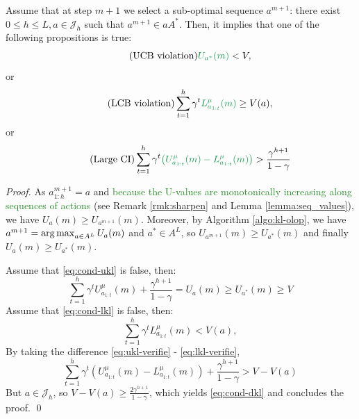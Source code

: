 \documentclass[runningheads]{llncs}
\newcommand{\diff}[1]{\textcolor{ForestGreen}{#1}}
\begin{document}
\begin{lemma}
\label{lemma:sub-optimal-pull}
Assume that at step $m+1$ we select a sub-optimal sequence $a^{m+1}$: there exist $0 \leq h \leq L,  a\in \mathcal{J}_h$ such that $a^{m+1} \in aA^*$. Then, it implies that one of the following propositions is true:
\begin{equation}
\label{eq:cond-ukl}
\tag{UCB violation}
    \diff{U_{a^*}(m)} < V,
\end{equation}
or
\begin{equation}
\tag{LCB violation}
\label{eq:cond-lkl}
    \sum_{t=1}^h \gamma^t \diff{L^{\mu}_{a_{1:t}}(m)} \geq V(a),
\end{equation}
or
\begin{equation}
\tag{Large CI}
\label{eq:cond-dkl}
    \sum_{t=1}^h \gamma^t\diff{\left(U^{\mu}_{a_{1:t}}(m) - L^{\mu}_{a_{1:t}}(m)\right)} > \frac{\gamma^{h+1}}{1-\gamma}
\end{equation}
\end{lemma}
\begin{proof}
As $a^{m+1}_{1:h} = a$ and \diff{because the U-values are monotonically increasing along sequences of actions} (see Remark \ref{rmk:sharpen} and Lemma \ref{lemma:seq_values}), we have $U_a(m) \geq U_{a^{m+1}}(m)$. Moreover, by Algorithm \ref{algo:kl-olop}, we have $a^{m+1} = \operatorname*{arg\,max}_{a \in A^L}  U_a(m)$ and $a^*\in A^L$, so $U_{a^{m+1}}(m) \geq U_{a^*}(m)$ and finally $U_a(m) \geq U_{a^*}(m)$.

Assume that \eqref{eq:cond-ukl} is false, then:
\begin{equation}
\label{eq:ukl-verifie}
    \sum_{t=1}^h \gamma^t U^{\mu}_{a_{1:t}}(m) + \frac{\gamma^{h+1}}{1-\gamma} = U_a(m) \geq U_{a^*}(m) \geq V
\end{equation}
Assume that \eqref{eq:cond-lkl} is false, then:
\begin{equation}
\label{eq:lkl-verifie}
    \sum_{t=1}^h \gamma^t L^{\mu}_{a_{1:t}}(m) < V(a),
\end{equation}
By taking the difference \eqref{eq:ukl-verifie} - \eqref{eq:lkl-verifie}, 
\begin{equation*}
    \sum_{t=1}^h \gamma^t \left(U^{\mu}_{a_{1:t}}(m) - L^{\mu}_{a_{1:t}}(m)\right) + \frac{\gamma^{h+1}}{1-\gamma} > V - V(a)
\end{equation*}
But $a \in \mathcal{J}_h$, so $V - V(a) \geq \frac{2\gamma^{h+1}}{1-\gamma}$, which yields \eqref{eq:cond-dkl} and concludes the proof.
\qed
\end{proof}
\end{document}
